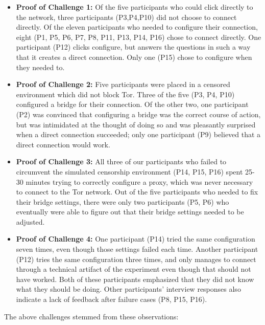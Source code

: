 \documentclass{template}
\begin{document}
\begin{itemize} \itemsep1pt \parskip0pt 
\item {\bfseries Proof of Challenge 1:} Of the five participants who could click directly to the network, three participants (P3,P4,P10) did not choose to connect directly.  Of the eleven participants who needed to configure their connection, eight (P1, P5, P6, P7, P8, P11, P13, P14, P16) chose to connect directly. One participant (P12) clicks configure, but answers the questions in such a way that it creates a direct connection. Only one (P15) chose to configure when they needed to.
\item {\bfseries Proof of Challenge 2:} Five participants were placed in a censored environment which did not block Tor. Three of the five (P3, P4, P10) configured a bridge for their connection. Of the other two, one participant (P2) was convinced that configuring a bridge was the correct course of action, but was intimidated at the thought of doing so and was pleasantly surprised when a direct connection succeeded; only one participant (P9) believed that a direct connection would work. 
\item {\bfseries Proof of Challenge 3:} All three of our participants who failed to circumvent the simulated censorship environment (P14, P15, P16) spent 25-30 minutes trying to correctly configure a proxy, which was never necessary to connect to the Tor network. Out of the five participants who needed to fix their bridge settings, there were only two participants (P5, P6) who eventually were able to figure out that their bridge settings needed to be adjusted.
\item {\bfseries Proof of Challenge 4:} One participant (P14) tried the same configuration seven times, even though those settings failed each time. Another participant (P12) tries the same configuration three times, and only manages to connect through a technical artifact of the experiment even though that should not have worked. Both of these participants emphasized that they did not know what they should be doing. Other participants' interview responses also indicate a lack of feedback after failure cases (P8, P15, P16). 
\end{itemize}

The above challenges stemmed from these observations: 
\end{document}

